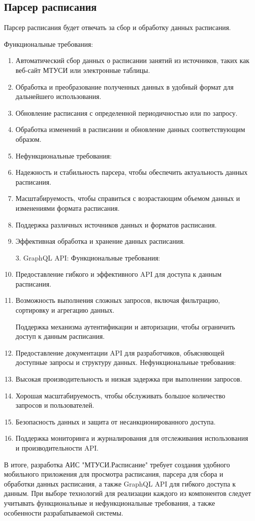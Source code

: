 \subsection{Парсер расписания}
Парсер расписания будет отвечать за сбор и обработку данных расписания. 

   Функциональные требования:
   \begin{enumerate}
      \item Автоматический сбор данных о расписании занятий из источников, таких как веб-сайт МТУСИ или электронные таблицы.
      \item Обработка и преобразование полученных данных в удобный формат для дальнейшего использования.
      \item Обновление расписания с определенной периодичностью или по запросу.
      \item Обработка изменений в расписании и обновление данных соответствующим образом.
    \item Нефункциональные требования:
      \item Надежность и стабильность парсера, чтобы обеспечить актуальность данных расписания.
      \item Масштабируемость, чтобы справиться с возрастающим объемом данных и изменениями формата расписания.
      \item Поддержка различных источников данных и форматов расписания.
      \item Эффективная обработка и хранение данных расписания.

3. GraphQL API:
   Функциональные требования:
      \item Предоставление гибкого и эффективного API для доступа к данным расписания.
      \item Возможность выполнения сложных запросов, включая фильтрацию, сортировку и агрегацию данных.
    

 Поддержка механизма аутентификации и авторизации, чтобы ограничить доступ к данным расписания.
      \item Предоставление документации API для разработчиков, объясняющей доступные запросы и структуру данных.
   Нефункциональные требования:
      \item Высокая производительность и низкая задержка при выполнении запросов.
      \item Хорошая масштабируемость, чтобы обслуживать большое количество запросов и пользователей.
      \item Безопасность данных и защита от несанкционированного доступа.
      \item Поддержка мониторинга и журналирования для отслеживания использования и производительности API.
    \end{enumerate}

В итоге, разработка АИС "МТУСИ.Расписание" требует создания удобного мобильного приложения для просмотра расписания, парсера для сбора и обработки данных расписания, а также GraphQL API для гибкого доступа к данным. При выборе технологий для реализации каждого из компонентов следует учитывать функциональные и нефункциональные требования, а также особенности разрабатываемой системы.
